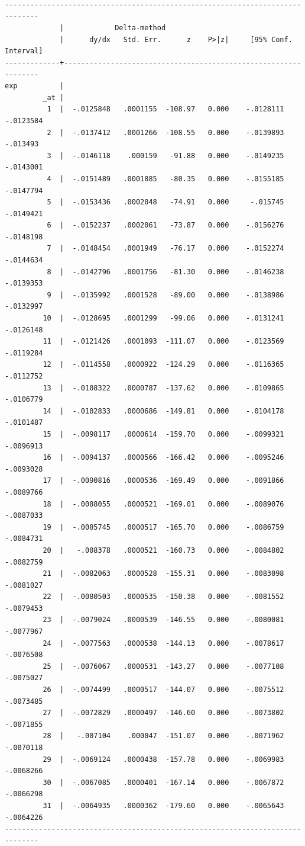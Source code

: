\documentclass[
]{book}
\begin{document}
\begin{verbatim}
------------------------------------------------------------------------------
             |            Delta-method
             |      dy/dx   Std. Err.      z    P>|z|     [95% Conf. Interval]
-------------+----------------------------------------------------------------
exp          |
         _at |
          1  |  -.0125848   .0001155  -108.97   0.000    -.0128111   -.0123584
          2  |  -.0137412   .0001266  -108.55   0.000    -.0139893    -.013493
          3  |  -.0146118    .000159   -91.88   0.000    -.0149235   -.0143001
          4  |  -.0151489   .0001885   -80.35   0.000    -.0155185   -.0147794
          5  |  -.0153436   .0002048   -74.91   0.000     -.015745   -.0149421
          6  |  -.0152237   .0002061   -73.87   0.000    -.0156276   -.0148198
          7  |  -.0148454   .0001949   -76.17   0.000    -.0152274   -.0144634
          8  |  -.0142796   .0001756   -81.30   0.000    -.0146238   -.0139353
          9  |  -.0135992   .0001528   -89.00   0.000    -.0138986   -.0132997
         10  |  -.0128695   .0001299   -99.06   0.000    -.0131241   -.0126148
         11  |  -.0121426   .0001093  -111.07   0.000    -.0123569   -.0119284
         12  |  -.0114558   .0000922  -124.29   0.000    -.0116365   -.0112752
         13  |  -.0108322   .0000787  -137.62   0.000    -.0109865   -.0106779
         14  |  -.0102833   .0000686  -149.81   0.000    -.0104178   -.0101487
         15  |  -.0098117   .0000614  -159.70   0.000    -.0099321   -.0096913
         16  |  -.0094137   .0000566  -166.42   0.000    -.0095246   -.0093028
         17  |  -.0090816   .0000536  -169.49   0.000    -.0091866   -.0089766
         18  |  -.0088055   .0000521  -169.01   0.000    -.0089076   -.0087033
         19  |  -.0085745   .0000517  -165.70   0.000    -.0086759   -.0084731
         20  |   -.008378   .0000521  -160.73   0.000    -.0084802   -.0082759
         21  |  -.0082063   .0000528  -155.31   0.000    -.0083098   -.0081027
         22  |  -.0080503   .0000535  -150.38   0.000    -.0081552   -.0079453
         23  |  -.0079024   .0000539  -146.55   0.000    -.0080081   -.0077967
         24  |  -.0077563   .0000538  -144.13   0.000    -.0078617   -.0076508
         25  |  -.0076067   .0000531  -143.27   0.000    -.0077108   -.0075027
         26  |  -.0074499   .0000517  -144.07   0.000    -.0075512   -.0073485
         27  |  -.0072829   .0000497  -146.60   0.000    -.0073802   -.0071855
         28  |   -.007104    .000047  -151.07   0.000    -.0071962   -.0070118
         29  |  -.0069124   .0000438  -157.78   0.000    -.0069983   -.0068266
         30  |  -.0067085   .0000401  -167.14   0.000    -.0067872   -.0066298
         31  |  -.0064935   .0000362  -179.60   0.000    -.0065643   -.0064226
------------------------------------------------------------------------------
\end{verbatim}
\end{document}
